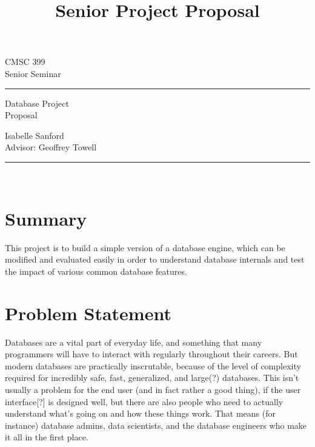 \documentclass[12pt, oneside]{amsart} %
\begin{document}

\title{Senior Project Proposal} %

\begin{minipage}{0.295\textwidth} %
\raggedright
CMSC 399\\ %
\footnotesize %
Senior Seminar %
\medskip\hrule
\end{minipage}
\begin{minipage}{0.4\textwidth} %
\centering 
\large %
Database Project\\ %
\normalsize 
Proposal \\ %
\end{minipage}
\begin{minipage}{0.295\textwidth} %
\raggedleft
Isabelle Sanford \\%
\footnotesize 
Advisor: Geoffrey Towell
\medskip\hrule
\end{minipage}\\

\section{Summary}

This project is to build a simple version of a database engine, which can be modified and evaluated easily in order to understand database internals and test the impact of various common database features. 


\section{Problem Statement}
Databases are a vital part of everyday life, and something that many programmers will have to interact with regularly throughout their careers. But modern databases are practically inscrutable, because of the level of complexity required for incredibly safe, fast, generalized, and large(?) databases. This isn't usually a problem for the end user (and in fact rather a good thing), if the user interface[?] is designed well, but there are also people who need to actually understand what's going on and how these things work. That means (for instance) database admins, data scientists, and the database engineers who make it all in the first place.
\end{document}
